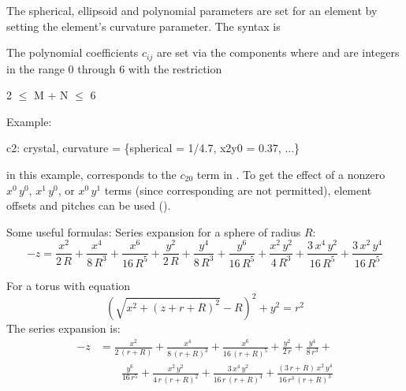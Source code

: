 The spherical, ellipsoid and polynomial parameters are set for an element by setting the element's
curvature parameter. The syntax is

The polynomial coefficients $c_{ij}$ are set via the  components where  and 
are integers in the range 0 through 6 with the restriction
\begin{example}
  2 \(\le\) M + N \(\le\) 6
\end{example}
Example:
\begin{example}
  c2: crystal, curvature = \{spherical = 1/4.7, x2y0 = 0.37, ...\}
\end{example}
in this example,  corresponds to the $c_{20}$ term in . To get the
effect of a nonzero $x^0\, y^0$, $x^1 \, y^0$, or $x^0 \, y^1$ terms (since corresponding
  are not permitted), element offsets and pitches can be used ().

Some useful formulas: Series expansion for a sphere of radius $R$:
\begin{equation}
  {-z} = \frac{x^2}{2 \, R} + \frac{x^4}{8 \, R^3} + \frac{x^6}{16 \, R^5} +
         \frac{y^2}{2 \, R} + \frac{y^4}{8 \, R^3} + \frac{y^6}{16 \, R^5} +
         \frac{x^2 \, y^2}{4 \, R^3} + \frac{3 \, x^4 \, y^2}{16 \, R^5} +
         \frac{3 \, x^2 \, y^4}{16 \, R^5} 
\end{equation}

For a torus with equation
\begin{equation}
  \left( \sqrt{x^2 + (z + r + R)^2} - R \right)^2 + y^2 = r^2
\end{equation}
The series expansion is:
\begin{align}
  {-z} &= \frac{x^2}{2 \, (r+R)} + \frac{x^4}{8 \, (r+R)^3} + \frac{x^6}{16 \, (r+R)^5} + 
         \frac{y^2}{2 \, r} + \frac{y^4}{8 \, r^3} + \\
  & \qquad \frac{y^6}{16 \, r^5} +
         \frac{x^2 \, y^2}{4 \, r \, (r+R)^2} + \frac{3 \, x^4 \, y^2}{16 \, r \, (r + R)^4} + 
         \frac{(3 \, r + R) \, x^2 \, y^4}{16 \, r^3 \, (r + R)^3} \nonumber
\end{align}

